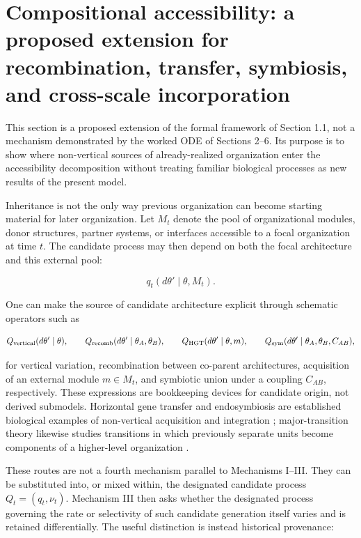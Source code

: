 \documentclass[11pt,a4paper]{article}
\begin{document}
\section{Compositional accessibility: a proposed extension for recombination, transfer, symbiosis, and cross-scale incorporation}

This section is a proposed extension of the formal framework of Section 1.1, not a mechanism demonstrated by the worked ODE of Sections 2--6. Its purpose is to show where non-vertical sources of already-realized organization enter the accessibility decomposition without treating familiar biological processes as new results of the present model.

Inheritance is not the only way previous organization can become starting material for later organization. Let $M_t$ denote the pool of organizational modules, donor structures, partner systems, or interfaces accessible to a focal organization at time $t$. The candidate process may then depend on both the focal architecture and this external pool:

\begin{equation}
q_t(d\theta'\mid\theta,M_t).
\label{eq:module-pool}
\end{equation}

One can make the source of candidate architecture explicit through schematic operators such as

\begin{equation*}
Q_{\rm vertical}(d\theta'\mid\theta),\qquad
Q_{\rm recomb}(d\theta'\mid\theta_A,\theta_B),\qquad
Q_{\rm HGT}(d\theta'\mid\theta,m),\qquad
Q_{\rm sym}(d\theta'\mid\theta_A,\theta_B,C_{AB}),
\end{equation*}

for vertical variation, recombination between co-parent architectures, acquisition of an external module $m\in M_t$, and symbiotic union under a coupling $C_{AB}$, respectively. These expressions are bookkeeping devices for candidate origin, not derived submodels. Horizontal gene transfer and endosymbiosis are established biological examples of non-vertical acquisition and integration \citep{Soucy2015,Archibald2015}; major-transition theory likewise studies transitions in which previously separate units become components of a higher-level organization \citep{SzathmarySmith1995}.

These routes are not a fourth mechanism parallel to Mechanisms I--III. They can be substituted into, or mixed within, the designated candidate process $Q_t=(q_t,\nu_t)$. Mechanism III then asks whether the designated process governing the rate or selectivity of such candidate generation itself varies and is retained differentially. The useful distinction is instead historical provenance:
\end{document}
